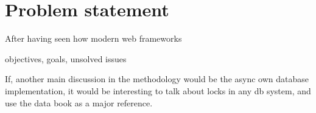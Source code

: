 \section{Problem statement}
After having seen how modern web frameworks 

objectives, goals, unsolved issues

If, another main discussion in the methodology would be the async own database implementation, it would be interesting to talk about locks in any db system, and use the data book as a major reference.